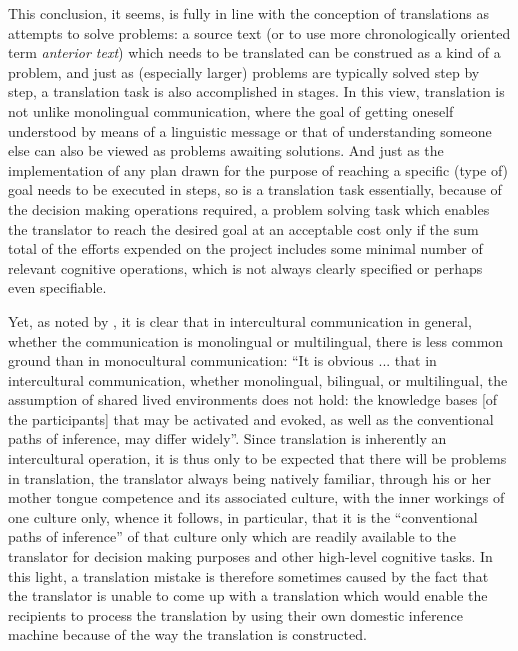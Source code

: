 \documentclass[output=paper]{LSP/langsci}
\begin{document}
  
  This conclusion, it seems, is fully in line with the conception of translations as attempts to solve problems: a source text (or to use \citet[37]{Halverson2013} more chronologically oriented term \textit{anterior text}) which needs to be translated can be construed as a kind of a problem, and just as (especially larger) problems are typically solved step by step, a translation task is also accomplished in stages. In this view, translation is not unlike monolingual communication, where the goal of getting oneself understood by means of a linguistic message or that of understanding someone else can also be viewed as problems awaiting solutions. And just as the implementation of any plan drawn for the purpose of reaching a specific (type of) goal needs to be executed in steps, so is a translation task essentially, because of the decision making operations required, a problem solving task which enables the translator to reach the desired goal at an acceptable cost only if the sum total of the efforts expended on the project includes some minimal number of relevant cognitive operations, which is not always clearly specified or perhaps even specifiable.

  
  Yet, as noted by \citet[39]{Halverson2013}, it is clear that in intercultural communication in general, whether the communication is monolingual or multilingual, there is less common ground than in monocultural communication: ``It is obvious ... that in intercultural communication, whether monolingual, bilingual, or multilingual, the assumption of shared lived environments does not hold: the knowledge bases [of the participants] that may be activated and evoked, as well as the conventional paths of inference, may differ widely''. Since translation is inherently an intercultural operation, it is thus only to be expected that there will be problems in translation, the translator always being natively familiar, through his or her mother tongue competence and its associated culture, with the inner workings of one culture only, whence it follows, in particular, that it is the ``conventional paths of inference'' of that culture only which are readily available to the translator for decision making purposes and other high-level cognitive tasks. In this light, a translation mistake is therefore sometimes caused by the fact that the translator is unable to come up with a translation which would enable the recipients to process the translation by using their own domestic inference machine because of the way the translation is constructed.
\end{document}
